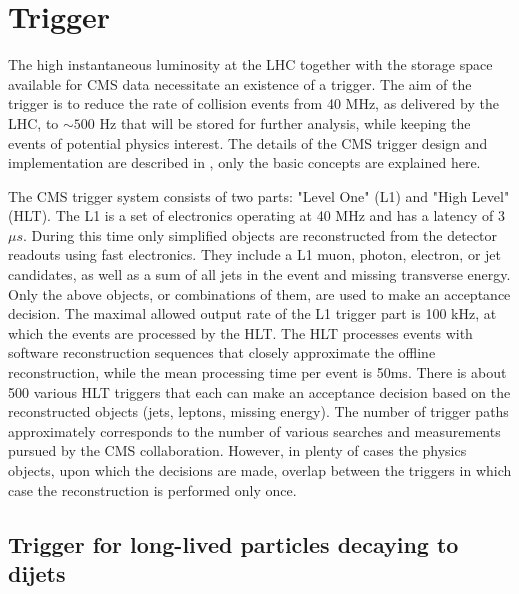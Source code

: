 \section{Trigger}

The high instantaneous luminosity at the LHC together with the storage space available for
CMS data necessitate an existence of a trigger.
 The aim of the trigger is to reduce the rate
of collision events from 40 MHz, as delivered by the LHC, to $\sim500$ Hz that will be stored
for further analysis, while keeping the events of potential physics interest.
The details of the CMS trigger design and implementation are described in \cite{Cittolin:578006},
only the basic concepts are explained here. 

The CMS trigger system consists of two parts: "Level One" (L1) and "High Level" (HLT).
The L1 is a set of electronics operating at 40 MHz and has a latency of 3~$\mu s$. During this
time only simplified 
objects are reconstructed from the detector readouts using fast electronics.
 They include a L1 muon, photon, 
electron, or jet candidates, as well as a sum of all jets in the event and missing transverse energy.
Only the above objects, or combinations of them, are used to make an acceptance decision. 
The maximal allowed output
rate of the L1 trigger part is 100 kHz, at which the events are processed by the HLT.
The HLT processes events with software reconstruction sequences that closely approximate
the offline reconstruction, while the mean processing time per event is 50ms. There is about 
500 various HLT triggers that each can make an acceptance decision based 
on the reconstructed objects
(jets, leptons, missing energy). The number of trigger paths approximately corresponds to the
number of various searches and measurements pursued by the CMS collaboration.
However, in plenty of cases the physics objects,
upon which the decisions are made, overlap between the triggers in which case the reconstruction 
is performed only once.


\subsection{Trigger for long-lived particles decaying to dijets}


